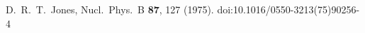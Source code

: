 \documentclass[review]{elsarticle}
\begin{document}
\begin{thebibliography}{}
  D.~R.~T.~Jones,
  Nucl.\ Phys.\ B {\bf 87}, 127 (1975).
  doi:10.1016/0550-3213(75)90256-4
 




  
 \end{thebibliography} 
\end{document}
